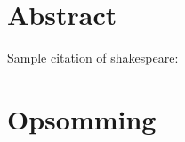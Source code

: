 \cleardoublepage
\section*{Abstract}

Sample citation of shakespeare: \cite{shakespeare2014complete}

\cleardoublepage
\section*{Opsomming}

\cleardoublepage
\tableofcontents

\cleardoublepage
\listoffigures

\cleardoublepage
\listoftables

\cleardoublepage
\listoffigures

\cleardoublepage







